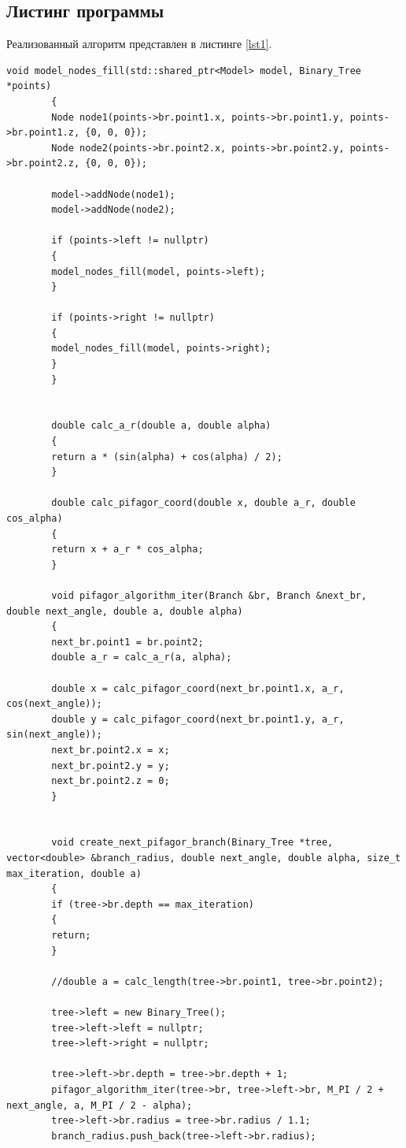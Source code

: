 \documentclass[a4paper,12pt]{article}
\begin{document}
	\subsection{Листинг программы}
	
	Реализованный алгоритм представлен
	в листинге \ref{lst1}.
	
	\begin{lstlisting}[label=lst1,caption=Реализация обнаженного дерева Пифагора]
		void model_nodes_fill(std::shared_ptr<Model> model, Binary_Tree *points)
		{
		Node node1(points->br.point1.x, points->br.point1.y, points->br.point1.z, {0, 0, 0});
		Node node2(points->br.point2.x, points->br.point2.y, points->br.point2.z, {0, 0, 0});
		
		model->addNode(node1);
		model->addNode(node2);
		
		if (points->left != nullptr)
		{
		model_nodes_fill(model, points->left);
		}
		
		if (points->right != nullptr)
		{
		model_nodes_fill(model, points->right);
		}
		}
		
		
		double calc_a_r(double a, double alpha)
		{
		return a * (sin(alpha) + cos(alpha) / 2);
		}
	
		double calc_pifagor_coord(double x, double a_r, double cos_alpha)
		{
		return x + a_r * cos_alpha;
		}
		
		void pifagor_algorithm_iter(Branch &br, Branch &next_br, double next_angle, double a, double alpha)
		{
		next_br.point1 = br.point2;
		double a_r = calc_a_r(a, alpha);
		
		double x = calc_pifagor_coord(next_br.point1.x, a_r, cos(next_angle));
		double y = calc_pifagor_coord(next_br.point1.y, a_r, sin(next_angle));
		next_br.point2.x = x;
		next_br.point2.y = y;
		next_br.point2.z = 0;
		}
		
		
		void create_next_pifagor_branch(Binary_Tree *tree, vector<double> &branch_radius, double next_angle, double alpha, size_t max_iteration, double a)
		{
		if (tree->br.depth == max_iteration)
		{
		return;
		}
		
		//double a = calc_length(tree->br.point1, tree->br.point2);
		
		tree->left = new Binary_Tree();
		tree->left->left = nullptr;
		tree->left->right = nullptr;
		
		tree->left->br.depth = tree->br.depth + 1;
		pifagor_algorithm_iter(tree->br, tree->left->br, M_PI / 2 + next_angle, a, M_PI / 2 - alpha);
		tree->left->br.radius = tree->br.radius / 1.1;
		branch_radius.push_back(tree->left->br.radius);
		

\end{lstlisting}
\end{document}
